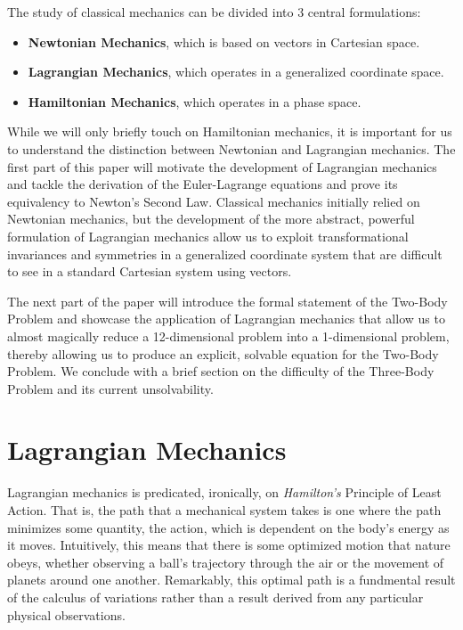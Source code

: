\documentclass[10.5pt, psamsfonts]{amsart}
\theoremstyle{definition}
\theoremstyle{remark}
\numberwithin{equation}{section}
\begin{document}
The study of classical mechanics can be divided into 3 central formulations:
\begin{itemize}
  \item[] \textbf{Newtonian Mechanics}, which is based on vectors in Cartesian space.
  \item[] \textbf{Lagrangian Mechanics}, which operates in a generalized coordinate space.
  \item[] \textbf{Hamiltonian Mechanics}, which operates in a phase space.
\end{itemize}
While we will only briefly touch on Hamiltonian mechanics, it is important for us to understand the distinction between Newtonian and Lagrangian mechanics. The first part of this paper will motivate the development of Lagrangian mechanics and tackle the derivation of the Euler-Lagrange equations and prove its equivalency to Newton's Second Law. Classical mechanics initially relied on Newtonian mechanics, but the development of the more abstract, powerful formulation of Lagrangian mechanics allow us to exploit transformational invariances and symmetries in a generalized coordinate system that are difficult to see in a standard Cartesian system using vectors.

The next part of the paper will introduce the formal statement of the Two-Body Problem and showcase the application of Lagrangian mechanics that allow us to almost magically reduce a 12-dimensional problem into a 1-dimensional problem, thereby allowing us to produce an explicit, solvable equation for the Two-Body Problem. We conclude with a brief section on the difficulty of the Three-Body Problem and its current unsolvability.

\section{Lagrangian Mechanics}
Lagrangian mechanics is predicated, ironically, on \textit{Hamilton's} Principle of Least Action. That is, the path that a mechanical system takes is one where the path minimizes some quantity, the action, which is dependent on the body's energy as it moves. Intuitively, this means that there is some optimized motion that nature obeys, whether observing a ball's trajectory through the air or the movement of planets around one another. Remarkably, this optimal path is a fundmental result of the calculus of variations rather than a result derived from any particular physical observations.
\end{document}
